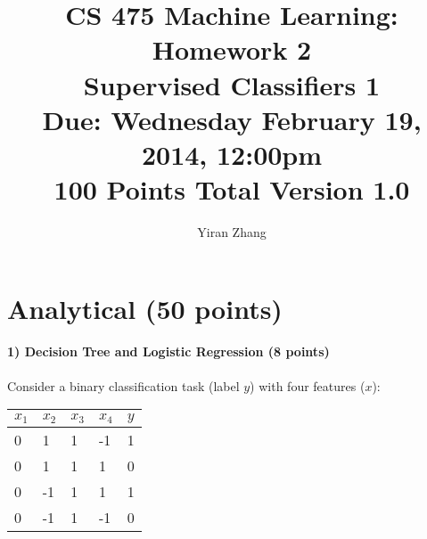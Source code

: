\documentclass[11pt]{article}
\title{CS 475 Machine Learning: Homework 2\\Supervised Classifiers 1\\
\Large{Due: Wednesday February 19, 2014, 12:00pm}\\
100 Points Total \hspace{1cm} Version 1.0}
\author{Yiran Zhang}
\date{}
\begin{document}
\large
\maketitle
\thispagestyle{headings}

\vspace{-.5in}

\section{Analytical (50 points)}

\paragraph{1) Decision Tree and Logistic Regression (8 points)}
Consider a binary classification task (label $y$) with four features ($x$):

\begin{tabular}{ |l|l|l|l|l| }
\hline
$x_1$ & $x_2$ & $x_3$ & $x_4$ & $y$ \\
\hline
 0& 1 & 1& -1 & 1 \\
 0&  1 & 1& 1 & 0 \\
 0&  -1 & 1& 1 & 1 \\
 0&  -1 & 1& -1 & 0 \\
\hline
\end{tabular}
\end{document}
